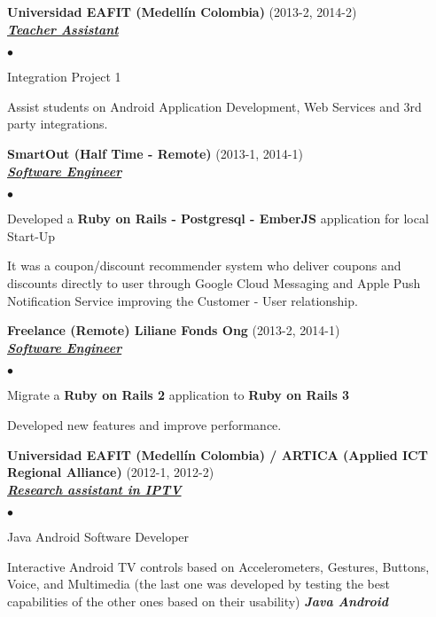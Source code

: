 \documentclass[a4paper]{article}
\newcommand{\employer}[3]{{
\textbf{#1} (#2)\\ \underline{\textbf{\emph{#3}}}\\ }}
\newenvironment{achievements}{\begin{list}{$\bullet$}{\topsep 0pt \itemsep
-2pt}}{\vspace*{4pt}\end{list}}
\newcommand{\programming}[1]{{\textbf{#1}}}
\newcommand{\emphasys}[1]{\textbf{\emph{#1}}}
\begin{document}
\employer{ Universidad EAFIT (Medell\'in Colombia) }{2013-2, 2014-2}{Teacher Assistant}
\begin{achievements}
\item Integration Project 1
\item Assist students on Android Application Development, Web Services and 3rd party integrations.
\end{achievements}

\newpage

\employer{ SmartOut (Half Time - Remote)}{2013-1, 2014-1}{Software Engineer}
\begin{achievements}
\item Developed a \programming{Ruby on Rails - Postgresql - EmberJS} application for local Start-Up
\item It was a coupon/discount recommender system who deliver coupons and discounts directly to user through Google Cloud Messaging and Apple Push Notification Service improving the Customer - User relationship.
\end{achievements}

\employer{ Freelance (Remote)  Liliane Fonds Ong}{2013-2, 2014-1}{Software Engineer}
\begin{achievements}
\item Migrate a \programming{Ruby on Rails 2} application to \programming{Ruby on Rails 3}
\item Developed new features and improve performance.
\end{achievements}

\employer{ Universidad EAFIT (Medell\'in Colombia) / ARTICA (Applied ICT Regional Alliance)} {2012-1, 2012-2} {Research assistant in IPTV}
\begin{achievements}
\item Java Android Software Developer
\item Interactive Android TV controls based on Accelerometers, Gestures, Buttons, Voice, and Multimedia (the last one was developed by testing the best capabilities of the other ones based on their usability) \emphasys{Java Android}
\end{achievements}

\end{document}
